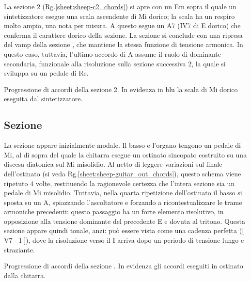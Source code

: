 \documentclass[class=book, crop=false, oneside, 12pt]{standalone}
\begin{document}
    La sezione 2 (Rg.\ref{sheet:sheep-c2_chords})  si apre con un Em  sopra il quale un sintetizzatore esegue una scala ascendente di Mi dorico; la scala ha un respiro molto ampio, una nota per misura. A questo segue un A7 (IV7 di E dorico) che conferma il carattere dorico della sezione. La sezione si conclude con una ripresa del vamp della sezione , che mantiene la stessa funzione di tensione armonica. In questo caso, tuttavia, l'ultimo accordo di A assume il ruolo di dominante secondaria, funzionale alla risoluzione sulla sezione successiva 2, la quale si sviluppa su un pedale di Re.

    \begin{sheet}[htb]
        \centering
        \caption[Progressione di accordi della sezione 2.]{Progressione di accordi della sezione 2. In evidenza in blu la scala di Mi dorico eseguita dal sintetizzatore.}
        \label{sheet:sheep-c2_chords}
    \end{sheet}

    \subsection{Sezione }
    La sezione  appare inizialmente modale. Il basso e l'organo tengono un pedale di Mi, al di sopra del quale la chitarra esegue un ostinato sincopato costruito su una discesa diatonica sul Mi misolidio. Al netto di leggere variazioni sul finale dell'ostinato (si veda Rg.\ref{sheet:sheep-guitar_out_chords}), questo schema viene ripetuto 4 volte, restituendo la ragionevole certezza che l'intera sezione sia un pedale di Mi misolidio. Tuttavia, nella quarta ripetizione dell'ostinato il basso si sposta su un A, spiazzando l'ascoltatore e forzando a ricontestualizzare le trame armoniche precedenti: questo passaggio ha un forte elemento risolutivo, in opposizione alla tensione dominante del precedente E e dovuta al tritono. Questa sezione appare quindi tonale, anzi: può essere vista come una cadenza perfetta ([ V7 - I ]), dove la risoluzione verso il I arriva dopo un periodo di tensione lungo e straziante.

    
    \begin{sheet}[htb]
        \centering
        \caption{Progressione di accordi della sezione . In evidenza gli accordi eseguiti in ostinato dalla chitarra.}
        \label{sheet:sheep-guitar_out_chords}
    \end{sheet}
    
\end{document}
